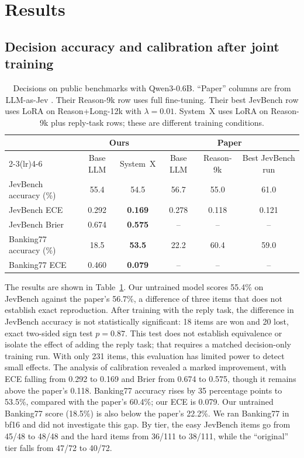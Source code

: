 \documentclass[11pt]{article}
\begin{document}
\section{Results}

\subsection{Decision accuracy and calibration after joint training}

\begin{table}[t]
\centering
\caption{Decisions on public benchmarks with Qwen3-0.6B. ``Paper'' columns are from LLM-as-Jev \citep{li2026llmasjev}. Their Reason-9k row uses full fine-tuning. Their best JevBench row uses LoRA on Reason+Long-12k with $\lambda=0.01$. System~X uses LoRA on Reason-9k plus reply-task rows; these are different training conditions.}
\label{tab:bench}
\small
\begin{tabular}{lccccc}
\toprule
& \multicolumn{2}{c}{Ours} & \multicolumn{3}{c}{Paper} \\
\cmidrule(lr){2-3}\cmidrule(lr){4-6}
& Base LLM & System~X & Base LLM & Reason-9k & Best JevBench run \\
\midrule
JevBench accuracy (\%) & 55.4 & 54.5 & 56.7 & 55.0 & 61.0 \\
JevBench ECE & 0.292 & \textbf{0.169} & 0.278 & 0.118 & 0.121 \\
JevBench Brier & 0.674 & \textbf{0.575} & -- & -- & -- \\
Banking77 accuracy (\%) & 18.5 & \textbf{53.5} & 22.2 & 60.4 & 59.0 \\
Banking77 ECE & 0.460 & \textbf{0.079} & -- & -- & -- \\
\bottomrule
\end{tabular}
\end{table}

The results are shown in Table~\ref{tab:bench}. Our untrained model scores 55.4\% on JevBench against the paper's 56.7\%, a difference of three items that does not establish exact reproduction. After training with the reply task, the difference in JevBench accuracy is not statistically significant: 18 items are won and 20 lost, exact two-sided sign test $p=0.87$. This test does not establish equivalence or isolate the effect of adding the reply task; that requires a matched decision-only training run. With only 231 items, this evaluation has limited power to detect small effects. The analysis of calibration revealed a marked improvement, with ECE falling from 0.292 to 0.169 and Brier from 0.674 to 0.575, though it remains above the paper's 0.118. Banking77 accuracy rises by 35 percentage points to 53.5\%, compared with the paper's 60.4\%; our ECE is 0.079. Our untrained Banking77 score (18.5\%) is also below the paper's 22.2\%. We ran Banking77 in bf16 and did not investigate this gap. By tier, the easy JevBench items go from 45/48 to 48/48 and the hard items from 36/111 to 38/111, while the ``original'' tier falls from 47/72 to 40/72.
\end{document}
